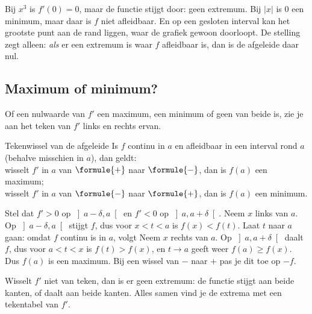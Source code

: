 Bij $x^3$ is $f'(0) = 0$, maar de functie stijgt door: geen extremum. Bij $|x|$ is $0$ een minimum, maar daar is $f$ niet afleidbaar. En op een gesloten interval kan het grootste punt aan de rand liggen, waar de grafiek gewoon doorloopt. De stelling zegt alleen: \textit{als} er een extremum is waar $f$ afleidbaar is, dan is de afgeleide daar nul.

\subsection{Maximum of minimum?}

Of een nulwaarde van $f'$ een maximum, een minimum of geen van beide is, zie je aan het teken van $f'$ links en rechts ervan.

\begin{theorie}
\begin{stelling}{Tekenwissel van de afgeleide}
Is $f$ continu in $a$ en afleidbaar in een interval rond $a$ (behalve misschien in $a$), dan geldt: \\[1mm]
\qquad wisselt $f'$ in $a$ van $\formule{+}$ naar $\formule{-}$, dan is $f(a)$ een maximum; \\
\qquad wisselt $f'$ in $a$ van $\formule{-}$ naar $\formule{+}$, dan is $f(a)$ een minimum.
\end{stelling}
\begin{bewijs}
Stel dat $f' > 0$ op $\left]a - \delta, a\right[$ en $f' < 0$ op $\left]a, a + \delta\right[$. Neem $x$ links van $a$. Op $\left]a - \delta, a\right[$ stijgt $f$, dus voor $x < t < a$ is $f(x) < f(t)$. Laat $t$ naar $a$ gaan: omdat $f$ continu is in $a$, volgt
Neem $x$ rechts van $a$. Op $\left]a, a + \delta\right[$ daalt $f$, dus voor $a < t < x$ is $f(t) > f(x)$, en $t \to a$ geeft weer $f(a) \geqslant f(x)$. Dus $f(a)$ is een maximum. Bij een wissel van $-$ naar $+$ pas je dit toe op $-f$.
\end{bewijs}
\end{theorie}

Wisselt $f'$ niet van teken, dan is er geen extremum: de functie stijgt aan beide kanten, of daalt aan beide kanten. Alles samen vind je de extrema met een tekentabel van $f'$.

